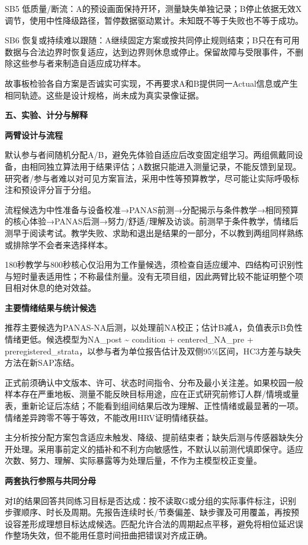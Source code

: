 \documentclass[11pt,a4paper]{article}
\newcommand{\reviewsection}[1]{\par\Needspace{9\baselineskip}\vspace{10pt}\begin{center}{\titlelatin\titlecjk\bfseries\fontsize{14}{20}\selectfont #1}\end{center}}
\newcommand{\reviewsubsection}[1]{\par\Needspace{4\baselineskip}\vspace{4pt}\begin{center}{\titlelatin\titlecjk\bfseries\fontsize{12}{18}\selectfont #1}\end{center}}
\begin{document}
SB5 低质量/\allowbreak{}断流：A的预设画面保持开环，测量缺失单独记录；B停止依据无效X调节，使用中性降级路径，暂停数据驱动累计。未知既不等于失败也不等于成功。


SB6 恢复或持续难以跟随：A继续固定方案或按共同停止规则结束；B只在有可用数据与合法边界时恢复适应，达到边界则休息或停止。保留故障与受限事件，不删除这些参与者来制造自适应成功样本。


故事板检验各自方案是否诚实可实现，不再要求A和B提供同一Actual信息或产生相同轨迹。这些是设计规格，尚未成为真实录像证据。


\reviewsection{五、实验、计分与解释}
\reviewsubsection{5.1 两臂设计与流程}
默认参与者间随机分配A/\allowbreak{}B，避免先体验自适应后改变固定组学习。两组佩戴同设备，由相同独立算法用于结果评估；A数据只能进入测量记录，不能反馈到呈现。研究者/\allowbreak{}参与者难以对可见方案盲法，采用中性等预算教学，尽可能让实际呼吸标注和预设评分盲于分组。


流程候选为中性准备与设备校准→PANAS前测→分配揭示与条件教学→相同预算的核心体验→PANAS后测→努力/\allowbreak{}舒适/\allowbreak{}理解及访谈。前测早于条件教学，情绪后测早于阅读考试。教学失败、求助和退出是结果的一部分，不以教到两组同样熟练或排除学不会者来选择样本。


180秒教学与800秒核心仅沿用为工作量候选，须检查自适应缓冲、四结构可识别性与短时量表适用性；不称最佳剂量。没有无项目组，因此两臂比较不能证明整个项目相对休息的绝对效益。


\reviewsubsection{5.2 主要情绪结果与统计候选}
推荐主要候选为PANAS-\allowbreak{}NA后测，以处理前NA校正；估计B减A，负值表示B负性情绪更低。候选模型为NA\_\allowbreak{}post \textasciitilde{} condition + centered\_\allowbreak{}NA\_\allowbreak{}pre + preregistered\_\allowbreak{}strata，以参与者为单位报告估计及双侧95\%区间，HC3方差与缺失方法在新SAP冻结。


正式前须确认中文版本、许可、状态时间指令、分布及最小关注差。如果校园一般样本存在严重地板、测量不能反映目标用途，应在正式研究前修订人群/\allowbreak{}情境或量表，重新论证后冻结；不能看到组间结果后改为理解、正性情绪或最显著的一项。情绪差异跨零不等于等效，不能改用HRV证明情绪获益。


主分析按分配方案包含适应未触发、降级、提前结束者；缺失后测与传感器缺失分开处理。采用事前定义的插补和不利方向敏感性，不默认以前测代填即保守。适应次数、努力、理解、实际暴露等为处理后量，不作为主模型校正变量。


\reviewsubsection{5.3 两套执行参照与共同分母}
对I的结果回答共同练习目标是否达成：按不读取G或分组的实际事件标注，识别步骤顺序、时长及周期。先报告连续时长/\allowbreak{}节奏偏差、缺步骤及可用覆盖，再按预设容差形成理想目标达成候选。匹配允许合法的周期起点平移，避免将相位延迟误作整场失效，但不能用任意时间扭曲把错误对齐成正确。
\end{document}
